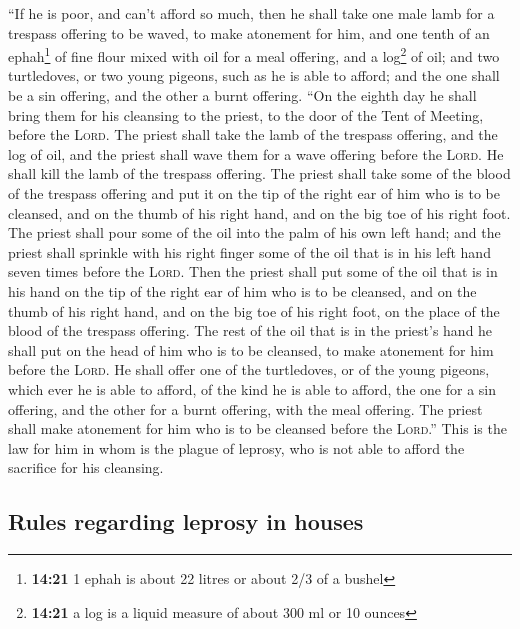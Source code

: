  ``If he is poor, and can't afford so much, then he shall
take one male lamb for a trespass offering to be waved, to make
atonement for him, and one tenth of an ephah\footnote{\textbf{14:21} 1
  ephah is about 22 litres or about 2/3 of a bushel} of fine flour mixed
with oil for a meal offering, and a log\footnote{\textbf{14:21} a log is
  a liquid measure of about 300 ml or 10 ounces} of oil; 
and two turtledoves, or two young pigeons, such as he is able to afford;
and the one shall be a sin offering, and the other a burnt offering.
 ``On the eighth day he shall bring them for his
cleansing to the priest, to the door of the Tent of Meeting, before the
\textsc{Lord}.  The priest shall take the lamb of the
trespass offering, and the log of oil, and the priest shall wave them
for a wave offering before the \textsc{Lord}.  He shall
kill the lamb of the trespass offering. The priest shall take some of
the blood of the trespass offering and put it on the tip of the right
ear of him who is to be cleansed, and on the thumb of his right hand,
and on the big toe of his right foot.  The priest shall
pour some of the oil into the palm of his own left hand; 
and the priest shall sprinkle with his right finger some of the oil that
is in his left hand seven times before the \textsc{Lord}.
 Then the priest shall put some of the oil that is in his
hand on the tip of the right ear of him who is to be cleansed, and on
the thumb of his right hand, and on the big toe of his right foot, on
the place of the blood of the trespass offering.  The
rest of the oil that is in the priest's hand he shall put on the head of
him who is to be cleansed, to make atonement for him before the
\textsc{Lord}.  He shall offer one of the turtledoves, or
of the young pigeons, which ever he is able to afford, 
of the kind he is able to afford, the one for a sin offering, and the
other for a burnt offering, with the meal offering. The priest shall
make atonement for him who is to be cleansed before the \textsc{Lord}.''
 This is the law for him in whom is the plague of
leprosy, who is not able to afford the sacrifice for his cleansing.

\hypertarget{rules-regarding-leprosy-in-houses}{%
\subsection{Rules regarding leprosy in
houses}\label{rules-regarding-leprosy-in-houses}}

